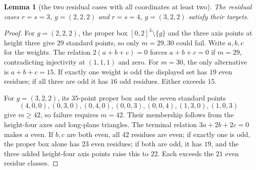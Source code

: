 \documentclass[11pt]{article}
\newtheorem{lemma}[theorem]{Lemma}
\theoremstyle{definition}
\theoremstyle{remark}
\theoremstyle{plain}
\begin{document}
\begin{lemma}[the two residual cases with all coordinates at least two]\label{res:A3.3}
The residual cases $r=s=3$, $g=(2,2,2)$ and $r=s=4$, $g=(3,2,2)$
satisfy their targets.
\end{lemma}
\begin{proof}
For $g=(2,2,2)$, the proper box $[0,2]^3\setminus\{g\}$ and the three
axis points at height three give $29$ standard points, so only $m=29,30$
could fail.  Write $a,b,c$ for the weights.  The relation
$2(a+b+c)=0$ forces $a+b+c=0$ if $m=29$, contradicting injectivity at
$(1,1,1)$ and zero.  For $m=30$, the only alternative is $a+b+c=15$.
If exactly one weight is odd the displayed set has $19$ even residues;
if all three are odd it has $16$ odd residues.  Either exceeds $15$.

For $g=(3,2,2)$, its $35$-point proper box and the seven standard points
\[
(4,0,0),(0,3,0),(0,4,0),(0,0,3),(0,0,4),(1,3,0),(1,0,3)
\]
give $m\ge42$, so failure requires $m=42$.  Their membership follows
from the height-four axes and long-plane triangles.  The terminal
relation $3a+2b+2c=0$ makes $a$ even.  If $b,c$ are both even, all
$42$ residues are even; if exactly one is odd, the proper box alone has
$23$ even residues; if both are odd, it has $19$, and the three added
height-four axis points raise this to $22$.  Each exceeds the $21$
even residue classes. \end{proof}
\end{document}
